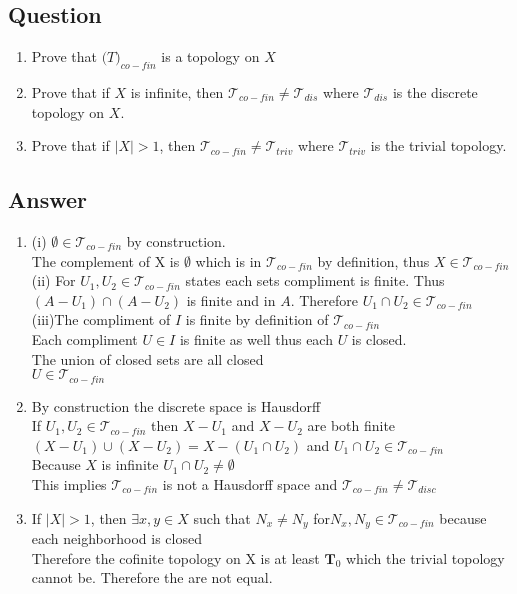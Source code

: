 \documentclass{article}
\begin{document}
\subsection*{Question}
\begin{enumerate}[label=\alph*]
\item Prove that \(\mathscr(T)_{co-fin}\) is a topology on \(X\)
\item Prove that if \(X\) is infinite, then \(\mathscr{T}_{co-fin} \neq \mathscr{T}_{dis}\) where \(\mathscr{T}_{dis}\) is the discrete topology on \(X\).
\item Prove that if \(|X| > 1\), then \(\mathscr{T}_{co-fin} \neq \mathscr{T}_{triv}\) where \(\mathscr{T}_{triv}\) is the trivial topology. 
\end{enumerate}
\subsection*{Answer}
\begin{enumerate}[label=\alph*]
\item (i) \(\emptyset \in \mathscr{T}_{co-fin}\) by construction.
	\\ The complement of X is \(\emptyset\) which is in \(\mathscr{T}_{co-fin}\) by definition, thus \(X \in \mathscr{T}_{co-fin}\) 
	\\ (ii) For \(U_{1}, U_{2} \in \mathscr{T}_{co-fin}\) states each sets compliment is finite. Thus \((A - U_{1}) \cap (A - U_{2}) \) is finite and in \(A\). Therefore \(U_{1} \cap U_{2} \in \mathscr{T}_{co-fin}\)
	\\ (iii)The compliment of \(I\) is finite by definition of \(\mathscr{T}_{co-fin}\) 
	\\ Each compliment \(U \in I\) is finite as well thus each \(U\) is closed.
	\\ The union of closed sets are all closed
	\\ \(U \in \mathscr{T}_{co-fin}\)
\item By construction the discrete space is Hausdorff
	\\ If \(U_{1}, U_{2} \in \mathscr{T}_{co-fin}\) then \(X - U_{1}\) and \(X - U_{2}\) are both finite
	\\ \((X - U_{1}) \cup (X - U_{2}) = X - (U_{1} \cap U_{2})\) and \(U_{1} \cap U_{2} \in \mathscr{T}_{co-fin}\)
	\\ Because \(X\) is infinite \(U_{1} \cap U_{2} \ne \emptyset\)
	\\ This implies \(\mathscr{T}_{co-fin}\) is not a Hausdorff space and \(\mathscr{T}_{co-fin} \ne \mathscr{T}_{disc}\) 
\item If \(|X| > 1\), then \(\exists x,y \in X\) such that \(N_{x} \ne N_{y}\) for\( N_{x}, N_{y} \in \mathscr{T}_{co-fin}\) because each neighborhood is closed
	\\ Therefore the cofinite topology on X is at least \(\textbf{T}_{0}\) which the trivial topology cannot be. Therefore the are not equal.
\end{enumerate}
\end{document}

